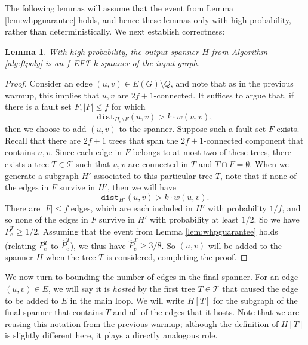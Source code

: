 \documentclass{article}
\theoremstyle{plain}
\newtheorem{lemma}[theorem]{Lemma}
\theoremstyle{definition}
\newcommand{\dist}{\texttt{dist}}
\newcommand{\tee}{\mathcal{T}}
\begin{document}
The following lemmas will assume that the event from Lemma \ref{lem:whpguarantee} holds, and hence these lemmas only with high probability, rather than deterministically.
We next establish correctness:
\begin{lemma} \label{lem:poly-correct}
With high probability, the output spanner $H$ from Algorithm \ref{alg:ftpoly} is an $f$-EFT $k$-spanner of the input graph.
\end{lemma}
\begin{proof}
Consider an edge $(u, v) \in E(G) \setminus Q$, and note that as in the previous warmup, this implies that $u, v$ are $2f+1$-connected.
It suffices to argue that, if there is a fault set $F, |F| \le f$ for which 
$$\dist_{H_e \setminus F}(u, v) > k \cdot w(u, v),$$
then we choose to add $(u, v)$ to the spanner.
Suppose such a fault set $F$ exists.
Recall that there are $2f+1$ trees that span the $2f+1$-connected component that contains $u, v$.
Since each edge in $F$ belongs to at most two of these trees, there exists a tree $T \in \mathcal{T}$ such that $u, v$ are connected in $T$ and $T \cap F = \emptyset$.
When we generate a subgraph $H'$ associated to this particular tree $T$, note that if none of the edges in $F$ survive in $H'$, then we will have
$$\dist_{H'}(u, v) > k \cdot w(u, v).$$
There are $|F|\le f$ edges, which are each included in $H'$ with probability $1/f$, and so none of the edges in $F$ survive in $H'$ with probability at least $1/2$.
So we have $P_e^T \ge 1/2$.
Assuming that the event from Lemma \ref{lem:whpguarantee} holds (relating $P^T_e$ to $\widehat{P}_e^T$), we thus have $\widehat{P}_e^T \ge 3/8$.
So $(u, v)$ will be added to the spanner $H$ when the tree $T$ is considered, completing the proof.
\end{proof}

We now turn to bounding the number of edges in the final spanner.
For an edge $(u, v) \in E$, we will say it is \emph{hosted} by the first tree $T \in \tee$ that caused the edge to be added to $E$ in the main loop.
We will write $H[T]$ for the subgraph of the final spanner that contains $T$ and all of the edges that it hosts.
Note that we are reusing this notation from the previous warmup; although the definition of $H[T]$ is slightly different here, it plays a directly analogous role.
\end{document}

